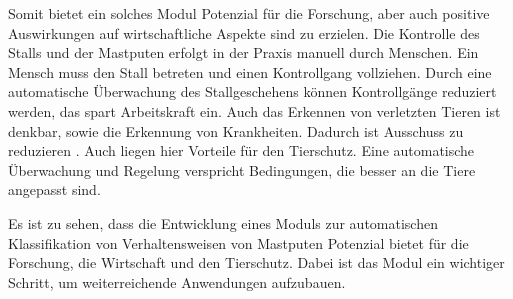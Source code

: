 Somit bietet ein solches Modul Potenzial für die Forschung, aber auch positive Auswirkungen auf wirtschaftliche Aspekte sind zu erzielen. Die Kontrolle des Stalls und der Mastputen erfolgt in der Praxis manuell durch Menschen. Ein Mensch muss den Stall betreten und einen Kontrollgang vollziehen. Durch eine automatische Überwachung des Stallgeschehens können Kontrollgänge reduziert werden, das spart Arbeitskraft ein. Auch das Erkennen von verletzten Tieren ist denkbar, sowie die Erkennung von Krankheiten. Dadurch ist Ausschuss zu reduzieren \cite{Chen.2023, Garcia.2020}. Auch liegen hier Vorteile für den Tierschutz. Eine automatische Überwachung und Regelung verspricht Bedingungen, die besser an die Tiere angepasst sind.\par

Es ist zu sehen, dass die Entwicklung eines Moduls zur automatischen Klassifikation von Verhaltensweisen von Mastputen Potenzial bietet für die Forschung, die Wirtschaft und den Tierschutz. Dabei ist das Modul ein wichtiger Schritt, um weiterreichende Anwendungen aufzubauen. 
